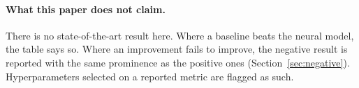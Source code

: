 \paragraph{What this paper does not claim.}
There is no state-of-the-art result here. Where a baseline beats the neural model,
the table says so. Where an improvement fails to improve, the negative result is
reported with the same prominence as the positive ones (Section~\ref{sec:negative}).
Hyperparameters selected on a reported metric are flagged as such.

